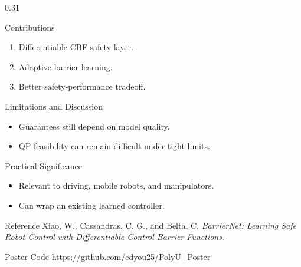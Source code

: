 \documentclass[final]{beamer}
\begin{document}
\begin{frame}[t]{}
\begin{columns}[t,totalwidth=\textwidth]
\begin{column}{0.31\textwidth}
\begin{block}{Contributions}
\begin{enumerate}
  \item Differentiable CBF safety layer.
  \item Adaptive barrier learning.
  \item Better safety-performance tradeoff.
\end{enumerate}
\end{block}

\begin{exampleblock}{Limitations and Discussion}
\begin{itemize}
  \item Guarantees still depend on model quality.
  \item QP feasibility can remain difficult under tight limits.
\end{itemize}
\end{exampleblock}

\begin{block}{Practical Significance}
\begin{itemize}
  \item Relevant to driving, mobile robots, and manipulators.
  \item Can wrap an existing learned controller.
\end{itemize}
\end{block}

\begin{block}{Reference}
\small
Xiao, W., Cassandras, C. G., and Belta, C. \textit{BarrierNet: Learning Safe Robot Control with Differentiable Control Barrier Functions}. 
\end{block}

\begin{block}{Poster Code}
\small
https://github.com/edyou25/PolyU\_Poster
\end{block}

\end{column}

\end{columns}
\end{frame}
\end{document}
